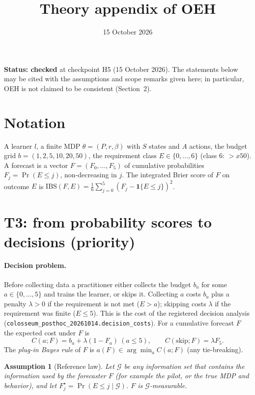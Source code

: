 \documentclass[10pt]{article}
\title{Theory appendix of OEH}
\date{15 October 2026}
\newtheorem{assumption}{Assumption}
\begin{document}
\maketitle

\noindent\textbf{Status: checked} at checkpoint H5 (15 October 2026). The statements below may be cited with the assumptions and scope remarks given here; in particular, OEH is not claimed to be consistent (Section~2).

\section*{Notation}
A learner $l$, a finite MDP $\theta=(P,r,\beta)$ with $S$ states and $A$ actions, the budget grid $b=(1,2,5,10,20,50)$, the requirement class $E\in\{0,\dots,6\}$ (class 6: $>x50$). A forecast is a vector $F=(F_0,\dots,F_5)$ of cumulative probabilities $F_j=\Pr(E\le j)$, non-decreasing in $j$. The integrated Brier score of $F$ on outcome $E$ is $\mathrm{IBS}(F,E)=\frac16\sum_{j=0}^5(F_j-\mathbf 1\{E\le j\})^2$.

\section{T3: from probability scores to decisions (priority)}

\paragraph{Decision problem.} Before collecting data a practitioner either collects the budget $b_a$ for some $a\in\{0,\dots,5\}$ and trains the learner, or skips it. Collecting $a$ costs $b_a$ plus a penalty $\lambda>0$ if the requirement is not met ($E>a$); skipping costs $\lambda$ if the requirement was finite ($E\le5$). This is the cost of the registered decision analysis (\texttt{colosseum\_posthoc\_20261014.decision\_costs}). For a cumulative forecast $F$ the expected cost under $F$ is
\begin{equation}
C(a;F)=b_a+\lambda(1-F_a)\ (a\le5),\qquad C(\mathrm{skip};F)=\lambda F_5 .
\end{equation}
The \emph{plug-in Bayes rule} of $F$ is $a(F)\in\arg\min_a C(a;F)$ (any tie-breaking).

\begin{assumption}[Reference law]\label{as:ref}
Let $\mathcal G$ be any information set that contains the information used by the forecaster $F$ (for example the pilot, or the true MDP and behavior), and let $F^\star_j=\Pr(E\le j\mid\mathcal G)$. $F$ is $\mathcal G$-measurable.
\end{assumption}
\end{document}
